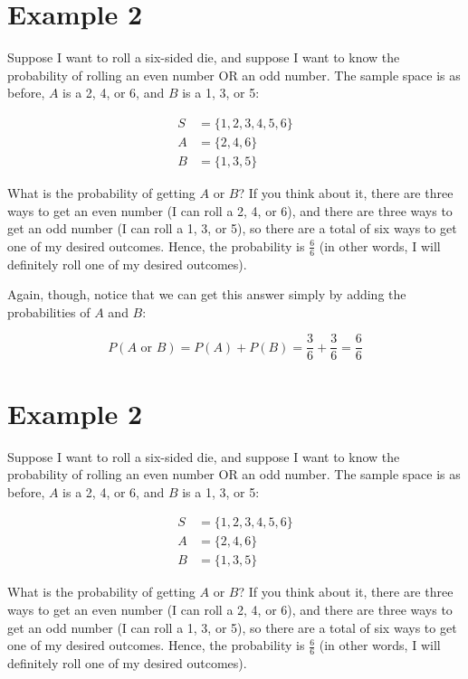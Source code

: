 \documentclass[../../../main.tex]{subfiles}
\begin{document}
\section{Example 2}

Suppose I want to roll a six-sided die, and suppose I want to know the probability of rolling an even number OR an odd number. The sample space is as before, $A$ is a 2, 4, or 6, and $B$ is a 1, 3, or 5:

\begin{align*}
  S &= \{ 1, 2, 3, 4, 5, 6 \} \\
  A &= \{ 2, 4, 6 \} \\
  B &= \{ 1, 3, 5 \}
\end{align*}

\noindent
What is the probability of getting $A$ or $B$? If you think about it, there are three ways to get an even number (I can roll a 2, 4, or 6), and there are three ways to get an odd number (I can roll a 1, 3, or 5), so there are a total of six ways to get one of my desired outcomes. Hence, the probability is $\frac{6}{6}$ (in other words, I will definitely roll one of my desired outcomes).

Again, though, notice that we can get this answer simply by adding the probabilities of $A$ and $B$:

\begin{equation*}
  P(A \text{ or } B) = P(A) + P(B) = \frac{3}{6} + \frac{3}{6} = \frac{6}{6}
\end{equation*}


\section{Example 2}

Suppose I want to roll a six-sided die, and suppose I want to know the probability of rolling an even number OR an odd number. The sample space is as before, $A$ is a 2, 4, or 6, and $B$ is a 1, 3, or 5:

\begin{align*}
  S &= \{ 1, 2, 3, 4, 5, 6 \} \\
  A &= \{ 2, 4, 6 \} \\
  B &= \{ 1, 3, 5 \}
\end{align*}

\noindent
What is the probability of getting $A$ or $B$? If you think about it, there are three ways to get an even number (I can roll a 2, 4, or 6), and there are three ways to get an odd number (I can roll a 1, 3, or 5), so there are a total of six ways to get one of my desired outcomes. Hence, the probability is $\frac{6}{6}$ (in other words, I will definitely roll one of my desired outcomes).
\end{document}
